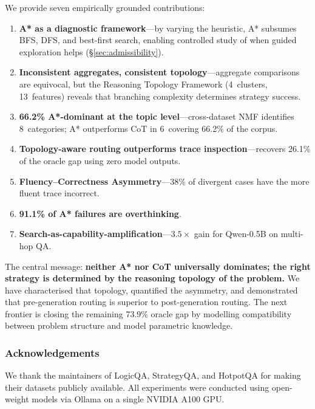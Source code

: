 \documentclass{article}
\begin{document}
We provide seven empirically grounded contributions:

\begin{enumerate}[leftmargin=1.5em,itemsep=3pt]
\item \textbf{A* as a diagnostic framework}---by varying the heuristic,
A* subsumes BFS, DFS, and best-first search, enabling controlled study of
when guided exploration helps (\S\ref{sec:admissibility}).
\item \textbf{Inconsistent aggregates, consistent topology}---aggregate
comparisons are equivocal, but the Reasoning Topology Framework (4~clusters,
13~features) reveals that branching complexity determines strategy success.
\item \textbf{66.2\% A*-dominant at the topic level}---cross-dataset NMF
identifies 8~categories; A* outperforms CoT in 6~covering 66.2\% of the
corpus.
\item \textbf{Topology-aware routing outperforms trace inspection}---recovers
26.1\% of the oracle gap using zero model outputs.
\item \textbf{Fluency--Correctness Asymmetry}---38\% of divergent cases have
the more fluent trace incorrect.
\item \textbf{91.1\% of A* failures are overthinking}.
\item \textbf{Search-as-capability-amplification}---$3.5\times$ gain for
Qwen-0.5B on multi-hop QA.
\end{enumerate}

\noindent The central message: \textbf{neither A* nor CoT universally
dominates; the right strategy is determined by the reasoning topology of the
problem.}  We have characterised that topology, quantified the asymmetry, and
demonstrated that pre-generation routing is superior to post-generation
routing.  The next frontier is closing the remaining 73.9\% oracle gap by
modelling compatibility between problem structure and model parametric
knowledge.

\subsubsection*{Acknowledgements}
We thank the maintainers of LogicQA, StrategyQA, and HotpotQA for
making their datasets publicly available.  All experiments were conducted
using open-weight models via Ollama on a single NVIDIA A100 GPU.



\end{document}
